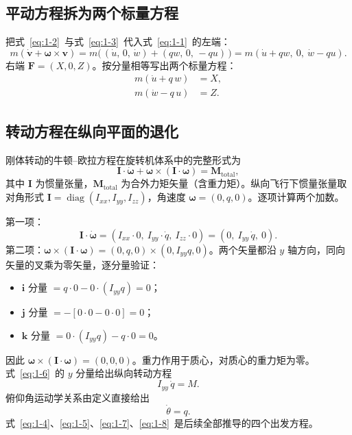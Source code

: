 \documentclass[11pt,a4paper]{ctexart}
\newcommand{\ud}[1]{\dot{#1}}
\newcommand{\bvec}[1]{\boldsymbol{#1}}
\begin{document}
\subsection{平动方程拆为两个标量方程}

把式~\eqref{eq:1-2}~与式~\eqref{eq:1-3}~代入式~\eqref{eq:1-1}~的左端：
\[
m\left(\ud{\bvec{v}} + \bvec{\omega}\times\bvec{v}\right)
= m\bigl(\,(\ud u,\,0,\,\ud w) + (q w,\,0,\,-q u)\,\bigr)
= m\left(\ud u + q w,\ 0,\ \ud w - q u\right).
\]
右端 $\bvec{F} = (X, 0, Z)$。按分量相等写出两个标量方程：
\begin{align}
m\left(\ud{u} + q\,w\right) &= X, \label{eq:1-4}\tag{(1-4)}\\[2pt]
m\left(\ud{w} - q\,u\right) &= Z. \label{eq:1-5}\tag{(1-5)}
\end{align}

\subsection{转动方程在纵向平面的退化}

刚体转动的牛顿--欧拉方程在旋转机体系中的完整形式为
\begin{equation}\label{eq:1-6}
\mathbf{I}\cdot\ud{\bvec{\omega}} + \bvec{\omega}\times\left(\mathbf{I}\cdot\bvec{\omega}\right) = \bvec{M}_{\text{total}},
\tag{(1-6)}
\end{equation}
其中 $\mathbf{I}$ 为惯量张量，$\bvec{M}_{\text{total}}$ 为合外力矩矢量（含重力矩）。纵向飞行下惯量张量取对角形式 $\mathbf{I}=\operatorname{diag}(I_{xx},I_{yy},I_{zz})$，角速度 $\bvec{\omega}=(0,q,0)$。逐项计算两个加数。

第一项：
\[
\mathbf{I}\cdot\ud{\bvec{\omega}} = \left(I_{xx}\cdot 0,\ I_{yy}\cdot\ud q,\ I_{zz}\cdot 0\right) = \left(0,\ I_{yy}\,\ud q,\ 0\right).
\]
第二项：$\bvec{\omega}\times(\mathbf{I}\cdot\bvec{\omega}) = (0,q,0)\times(0,I_{yy}q,0)$。两个矢量都沿 $y$ 轴方向，同向矢量的叉乘为零矢量，逐分量验证：
\begin{itemize}[itemsep=1pt]
  \item $\bvec{i}$ 分量 $= q\cdot 0 - 0\cdot(I_{yy}q) = 0$；
  \item $\bvec{j}$ 分量 $= -\left[0\cdot 0 - 0\cdot 0\right] = 0$；
  \item $\bvec{k}$ 分量 $= 0\cdot(I_{yy}q) - q\cdot 0 = 0$。
\end{itemize}
因此 $\bvec{\omega}\times(\mathbf{I}\cdot\bvec{\omega})=(0,0,0)$。重力作用于质心，对质心的重力矩为零。式~\eqref{eq:1-6}~的 $y$ 分量给出纵向转动方程
\begin{equation}\label{eq:1-7}
I_{yy}\,\ud q = M.
\tag{(1-7)}
\end{equation}
俯仰角运动学关系由定义直接给出
\begin{equation}\label{eq:1-8}
\ud\theta = q.
\tag{(1-8)}
\end{equation}
式~\eqref{eq:1-4}、\eqref{eq:1-5}、\eqref{eq:1-7}、\eqref{eq:1-8}~是后续全部推导的四个出发方程。
\end{document}
